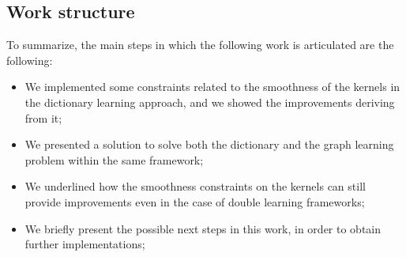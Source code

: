 \subsection{Work structure}
To summarize, the main steps in which the following work is articulated are the following:
\begin{itemize}
\item We implemented some constraints related to the smoothness of the kernels in the dictionary learning approach, and we showed the improvements deriving from it;
\item We presented a solution to solve both the dictionary and the graph learning problem within the same framework;
\item We underlined how the smoothness constraints on the kernels can still provide improvements even in the case of double learning frameworks;
\item We briefly present the possible next steps in this work, in order to obtain further implementations;
\end{itemize}
